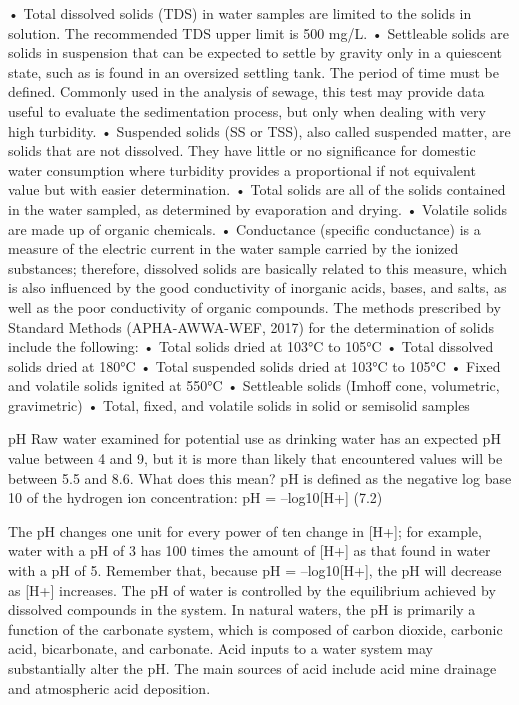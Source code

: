 \documentclass{article}
\begin{document}
• Total dissolved solids (TDS) in water samples are limited to the
solids in solution. The recommended TDS upper limit is 500 mg/L. •
Settleable solids are solids in suspension that can be expected to
settle by gravity only in a quiescent state, such as is found in an
oversized settling tank. The period of time must be defined. Commonly
used in the analysis of sewage, this test may provide data useful to
evaluate the sedimentation process, but only when dealing with very high
turbidity. • Suspended solids (SS or TSS), also called suspended matter,
are solids that are not dissolved. They have little or no significance
for domestic water consumption where turbidity provides a proportional
if not equivalent value but with easier determination. • Total solids
are all of the solids contained in the water sampled, as determined by
evaporation and drying. • Volatile solids are made up of organic
chemicals. • Conductance (specific conductance) is a measure of the
electric current in the water sample carried by the ionized substances;
therefore, dissolved solids are basically related to this measure, which
is also influenced by the good conductivity of inorganic acids, bases,
and salts, as well as the poor conductivity of organic compounds. The
methods prescribed by Standard Methods (APHA-AWWA-WEF, 2017) for the
determination of solids include the following: • Total solids dried at
103°C to 105°C • Total dissolved solids dried at 180°C • Total suspended
solids dried at 103°C to 105°C • Fixed and volatile solids ignited at
550°C • Settleable solids (Imhoff cone, volumetric, gravimetric) •
Total, fixed, and volatile solids in solid or semisolid samples

pH Raw water examined for potential use as drinking water has an
expected pH value between 4 and 9, but it is more than likely that
encountered values will be between 5.5 and 8.6. What does this mean? pH
is defined as the negative log base 10 of the hydrogen ion
concentration: pH = --log10{[}H+{]} (7.2)

The pH changes one unit for every power of ten change in {[}H+{]}; for
example, water with a pH of 3 has 100 times the amount of {[}H+{]} as
that found in water with a pH of 5. Remember that, because pH =
--log10{[}H+{]}, the pH will decrease as {[}H+{]} increases. The pH of
water is controlled by the equilibrium achieved by dissolved compounds
in the system. In natural waters, the pH is primarily a function of the
carbonate system, which is composed of carbon dioxide, carbonic acid,
bicarbonate, and carbonate. Acid inputs to a water system may
substantially alter the pH. The main sources of acid include acid mine
drainage and atmospheric acid deposition.
\end{document}
